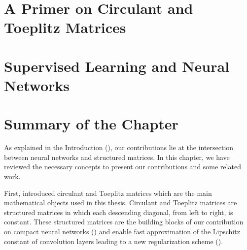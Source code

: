 \section{A Primer on Circulant and Toeplitz Matrices}
\label{section:ch2-a_primer_on_circulant_and_toeplitz_matrices}



\section{Supervised Learning and Neural Networks}
\label{section:ch2-supervised_learning_neural_networks}



\section{Summary of the Chapter}
\label{section:ch2-summary_of_the_background}

As explained in the Introduction (), our contributions lie at the intersection between neural networks and structured matrices.
In this chapter, we have reviewed the necessary concepts to present our contributions and some related work.

First,  introduced circulant and Toeplitz matrices which are the main mathematical objects used in this thesis.
Circulant and Toeplitz matrices are structured matrices in which each descending diagonal, from left to right, is constant.
These structured matrices are the building blocks of our contribution on compact neural networks () and enable fast approximation of the Lipschitz constant of convolution layers leading to a new regularization scheme ().

